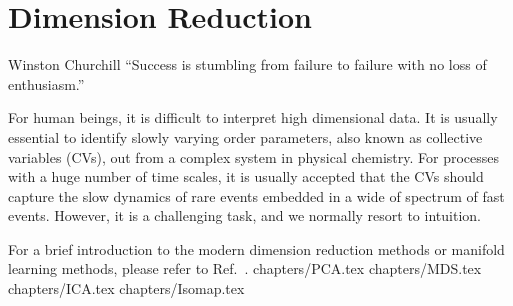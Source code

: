 \chapter{Dimension Reduction\label{chapter:DR}}
\begin{chapquote}{Winston Churchill%
	}
	``Success is stumbling from failure to failure with no loss of enthusiasm.''
\end{chapquote}
For human beings, it is difficult to interpret high dimensional data. It is usually essential to identify slowly varying order parameters, also known as collective variables (CVs), out from a complex system in physical chemistry. For processes with a huge number of time scales, it is usually accepted that the CVs should capture the slow dynamics of rare events embedded in a wide of spectrum of fast events. However, it is a challenging task, and we normally resort to intuition.

For a brief introduction to the modern dimension reduction methods or manifold learning methods, please refer to Ref.~\cite{IzamanWIREsCS2012}.
\clearpage 
 {chapters/PCA.tex}
\clearpage
 {chapters/MDS.tex}
\clearpage
 {chapters/ICA.tex}
\clearpage
 {chapters/Isomap.tex}

